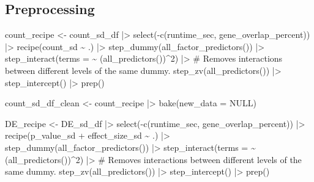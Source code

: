 \documentclass[
  letterpaper,
]{article}
\newenvironment{Shaded}{\begin{snugshade}}{\end{snugshade}}
\newcommand{\AttributeTok}[1]{\textcolor[rgb]{0.40,0.45,0.13}{#1}}
\newcommand{\CommentTok}[1]{\textcolor[rgb]{0.37,0.37,0.37}{#1}}
\newcommand{\ConstantTok}[1]{\textcolor[rgb]{0.56,0.35,0.01}{#1}}
\newcommand{\DecValTok}[1]{\textcolor[rgb]{0.68,0.00,0.00}{#1}}
\newcommand{\FunctionTok}[1]{\textcolor[rgb]{0.28,0.35,0.67}{#1}}
\newcommand{\NormalTok}[1]{\textcolor[rgb]{0.00,0.23,0.31}{#1}}
\newcommand{\OtherTok}[1]{\textcolor[rgb]{0.00,0.23,0.31}{#1}}
\newcommand{\SpecialCharTok}[1]{\textcolor[rgb]{0.37,0.37,0.37}{#1}}
\begin{document}
\subsection{Preprocessing}\label{preprocessing}

\begin{Shaded}
\begin{Highlighting}[]
\NormalTok{count\_recipe }\OtherTok{\textless{}{-}}\NormalTok{ count\_sd\_df }\SpecialCharTok{|\textgreater{}} 
    \FunctionTok{select}\NormalTok{(}\SpecialCharTok{{-}}\FunctionTok{c}\NormalTok{(runtime\_sec, gene\_overlap\_percent)) }\SpecialCharTok{|\textgreater{}} 
    \FunctionTok{recipe}\NormalTok{(count\_sd }\SpecialCharTok{\textasciitilde{}}\NormalTok{ .) }\SpecialCharTok{|\textgreater{}} 
    \FunctionTok{step\_dummy}\NormalTok{(}\FunctionTok{all\_factor\_predictors}\NormalTok{()) }\SpecialCharTok{|\textgreater{}}  
    \FunctionTok{step\_interact}\NormalTok{(}\AttributeTok{terms =} \SpecialCharTok{\textasciitilde{}}\NormalTok{ (}\FunctionTok{all\_predictors}\NormalTok{())}\SpecialCharTok{\^{}}\DecValTok{2}\NormalTok{) }\SpecialCharTok{|\textgreater{}}  
    \CommentTok{\# Removes interactions between different levels of the same dummy. }
    \FunctionTok{step\_zv}\NormalTok{(}\FunctionTok{all\_predictors}\NormalTok{()) }\SpecialCharTok{|\textgreater{}} 
    \FunctionTok{step\_intercept}\NormalTok{() }\SpecialCharTok{|\textgreater{}} 
    \FunctionTok{prep}\NormalTok{()}

\NormalTok{count\_sd\_df\_clean }\OtherTok{\textless{}{-}}\NormalTok{ count\_recipe }\SpecialCharTok{|\textgreater{}} \FunctionTok{bake}\NormalTok{(}\AttributeTok{new\_data =} \ConstantTok{NULL}\NormalTok{)}

\NormalTok{DE\_recipe }\OtherTok{\textless{}{-}}\NormalTok{ DE\_sd\_df }\SpecialCharTok{|\textgreater{}} 
    \FunctionTok{select}\NormalTok{(}\SpecialCharTok{{-}}\FunctionTok{c}\NormalTok{(runtime\_sec, gene\_overlap\_percent)) }\SpecialCharTok{|\textgreater{}} 
    \FunctionTok{recipe}\NormalTok{(p\_value\_sd }\SpecialCharTok{+}\NormalTok{ effect\_size\_sd }\SpecialCharTok{\textasciitilde{}}\NormalTok{ .) }\SpecialCharTok{|\textgreater{}} 
    \FunctionTok{step\_dummy}\NormalTok{(}\FunctionTok{all\_factor\_predictors}\NormalTok{()) }\SpecialCharTok{|\textgreater{}}  
    \FunctionTok{step\_interact}\NormalTok{(}\AttributeTok{terms =} \SpecialCharTok{\textasciitilde{}}\NormalTok{ (}\FunctionTok{all\_predictors}\NormalTok{())}\SpecialCharTok{\^{}}\DecValTok{2}\NormalTok{) }\SpecialCharTok{|\textgreater{}}  
    \CommentTok{\# Removes interactions between different levels of the same dummy. }
    \FunctionTok{step\_zv}\NormalTok{(}\FunctionTok{all\_predictors}\NormalTok{()) }\SpecialCharTok{|\textgreater{}} 
    \FunctionTok{step\_intercept}\NormalTok{() }\SpecialCharTok{|\textgreater{}} 
    \FunctionTok{prep}\NormalTok{()}


\end{Highlighting}
\end{Shaded}
\end{document}
